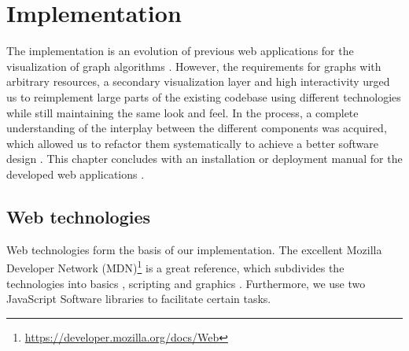 \chapter{Implementation}\label{ch:5}

\newenvironment{ssfont}{\fontfamily{lmss}\selectfont}{\par}

The implementation is an evolution of previous web applications for the visualization of graph algorithms \cite{storz2013idp,velden2014idp,sefidgar2015idp,becker2015idp,zoennchen2015idp}. However, the requirements for graphs with arbitrary resources, a secondary visualization layer and high interactivity urged us to reimplement large parts of the existing codebase using different technologies  while still maintaining the same look and feel. In the process, a complete understanding of the interplay between the different components was acquired, which allowed us to refactor them systematically to achieve a better software design . This chapter concludes with an installation or deployment manual for the developed web applications .

\section{Web technologies}\label{sec:technologies}
Web technologies form the basis of our implementation. The excellent Mozilla Developer Network (MDN)\footnote{\url{https://developer.mozilla.org/docs/Web}} is a great reference, which subdivides the technologies into basics , scripting  and graphics . Furthermore, we use two JavaScript Software libraries  to facilitate certain tasks.

